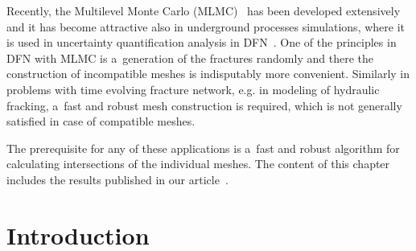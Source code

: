 Recently, the Multilevel Monte Carlo (MLMC)~\cite{giles_mlmc_2015} has been developed extensively and it has become attractive also
in underground processes simulations, where it is used in uncertainty quantification analysis in DFN~\cite{berrone_uncertainty_2015, berrone_uncertainty_2018}.
One of the principles in DFN with MLMC is a~generation of the fractures randomly and there the construction of 
incompatible meshes is indisputably more convenient.
Similarly in problems with time evolving fracture network, e.g. in modeling of hydraulic fracking,
a~fast and robust mesh construction is required, which is not generally satisfied in case of compatible meshes.

The prerequisite for any of these applications is a~fast and robust algorithm for calculating intersections of the individual meshes.
The content of this chapter includes the results published in our article~\cite{brezina_2017}.



\section{Introduction}


